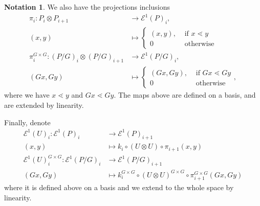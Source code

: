 \documentclass[10 pt]{amsart}
\theoremstyle{plain}
\theoremstyle{definition}
\newtheorem{note}[thm]{Notation}
\theoremstyle{remark}
\numberwithin{equation}{section}
\begin{document}
\begin{note}
We also have the projections inclusions
\begin{align*}
	\pi_i:P_i \otimes P_{i+1} & \rightarrow \mathcal E^1(P)_{i},\\
	(x, y) &\mapsto  \begin{cases}
	(x, y), &\text{ if }x\lessdot y\\
	0 &\text { otherwise}
\end{cases}\\
	\pi_i^{G\times G}: (P/G)_i \otimes (P/G)_{i+1} &\rightarrow\mathcal E^1(P/G)_i,\\
	(Gx, Gy) &\mapsto \begin{cases}
	(Gx, Gy), &\text{ if }Gx\lessdot Gy\\
	0 &\text { otherwise}
\end{cases},
\end{align*}
where we have $x \lessdot y$ and $Gx \lessdot Gy.$ The maps above are defined on a basis, and are extended by linearity.

Finally, denote
\begin{align*}
	\mathcal E^1(U)_i:\mathcal E^1(P)_i &\rightarrow \mathcal E^1(P)_{i+1}\\
	(x, y) &\mapsto k_i \circ (U \otimes U) \circ \pi_{i+1}(x, y)\\
\mathcal E^1(U)^{G\times G}_i:\mathcal E^1(P/G)_i & \rightarrow \mathcal E^1(P/G)_{i+1}\\
	(Gx, Gy) &\mapsto k^{G\times G}_i \circ (U \otimes U)^{G\times G} \circ \pi^{G\times G}_{i+1}(Gx, Gy)
\end{align*}
where it is defined above on a basis and we extend to the whole space by linearity.
\end{note}
\end{document}
